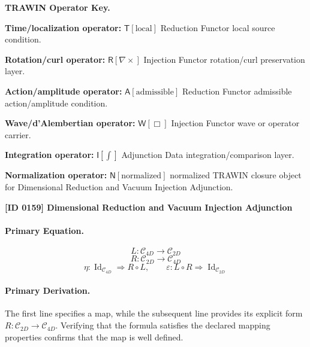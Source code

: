 \par\vspace{0.45\baselineskip}
\noindent\begin{minipage}[t]{\linewidth}
\begingroup
\small
\raggedright
\textbf{TRAWIN Operator Key.}\par
\noindent\textbf{Time/localization operator:} $\mathsf{T}\!\left[\mathrm{local}\right]$ Reduction Functor local source condition.\par
\noindent\textbf{Rotation/curl operator:} $\mathsf{R}\!\left[\nabla\times\right]$ Injection Functor rotation/curl preservation layer.\par
\noindent\textbf{Action/amplitude operator:} $\mathsf{A}\!\left[\mathrm{admissible}\right]$ Reduction Functor admissible action/amplitude condition.\par
\noindent\textbf{Wave/d'Alembertian operator:} $\mathsf{W}\!\left[\Box\right]$ Injection Functor wave or operator carrier.\par
\noindent\textbf{Integration operator:} $\mathsf{I}\!\left[\int\right]$ Adjunction Data integration/comparison layer.\par
\noindent\textbf{Normalization operator:} $\mathsf{N}\!\left[\mathrm{normalized}\right]$ normalized TRAWIN closure object for Dimensional Reduction and Vacuum Injection Adjunction.\par
\endgroup
\end{minipage}

\clearpage
\noindent\textbf{[ID 0159] Dimensional Reduction and Vacuum Injection Adjunction}\par
\vspace{0.35em}
\paragraph{Primary Equation.}
\[
L:\mathcal{C}_{4D}\longrightarrow \mathcal{C}_{2D}
\]
\[
R:\mathcal{C}_{2D}\longrightarrow \mathcal{C}_{4D}
\]
\[
\eta:\operatorname{Id}_{\mathcal{C}_{4D}}\Rightarrow R\circ L,
\qquad
\varepsilon:L\circ R\Rightarrow \operatorname{Id}_{\mathcal{C}_{2D}}
\]

\paragraph{Primary Derivation.}
The first line specifies a map, while the subsequent line provides its explicit form \( R:\mathcal{C}_{2D}\longrightarrow \mathcal{C}_{4D} \). Verifying that the formula satisfies the declared mapping properties confirms that the map is well defined.
